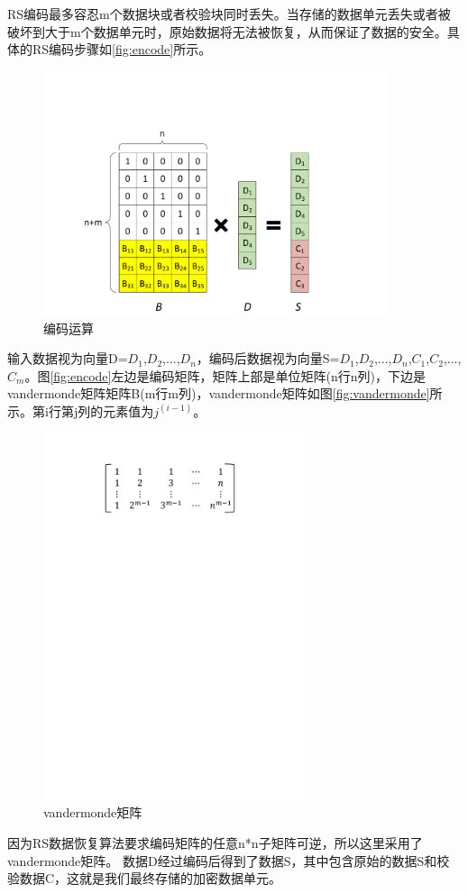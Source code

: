 RS编码最多容忍m个数据块或者校验块同时丢失。当存储的数据单元丢失或者被破坏到大于m个数据单元时，原始数据将无法被恢复，从而保证了数据的安全。具体的RS编码步骤如\autoref{fig:encode}所示。
\begin{figure}[H]
	\centering
	\includegraphics[width=4in]{Pics/encode.pdf}
	\caption{编码运算}\label{fig:encode}
\end{figure}
输入数据视为向量D={$D_1$,$D_2$,...,$D_n$}，编码后数据视为向量S={$D_1$,$D_2$,...,$D_n$,$C_1$,$C_2$,...,$C_m$}。图\autoref{fig:encode}左边是编码矩阵，矩阵上部是单位矩阵(n行n列)，下边是vandermonde矩阵矩阵B(m行m列)，vandermonde矩阵如图\autoref{fig:vandermonde}所示。第i行第j列的元素值为$j^(i-1)$。
\begin{figure}[H]
	\centering
	\includegraphics[width=3in]{Pics/vandermonde.pdf}
	\caption{vandermonde矩阵}\label{fig:vandermonde}
\end{figure}
因为RS数据恢复算法要求编码矩阵的任意n*n子矩阵可逆，所以这里采用了vandermonde矩阵。
数据D经过编码后得到了数据S，其中包含原始的数据S和校验数据C，这就是我们最终存储的加密数据单元。


